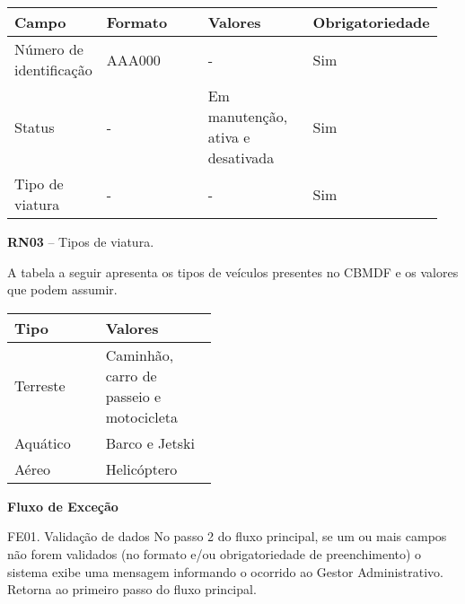    \begin{table*}[!h]
    \centering
      \begin{tabular}{|p{0.20\linewidth}|p{0.25\linewidth}|p{0.25\linewidth}|p{0.25\linewidth}|}
      \hline
      Campo & Formato & Valores & Obrigatoriedade\\
    
  \hline                               
  Número de identificação & AAA000 & - & Sim\\

  \hline                               
  Status & - & Em manutenção, ativa e desativada & Sim\\
  
  \hline                               
  Tipo de viatura & - & - & Sim\\
  
  \hline     
        
      \end{tabular}
    \end{table*}
    
  \textbf{RN03} – Tipos de viatura.
   
 A tabela a seguir apresenta os tipos de veículos presentes no CBMDF e os valores que podem assumir.
 
   \begin{table*}[!h]
    \centering
      \begin{tabular}{|p{0.20\linewidth}|p{0.25\linewidth}|}
      \hline
      Tipo & Valores\\
    
  \hline                               
  Terreste & Caminhão, carro de passeio e motocicleta\\

  \hline                               
  Aquático & Barco e Jetski\\

  \hline                               
  Aéreo & Helicóptero\\
  
  \hline     
        
      \end{tabular}
    \end{table*}

    
    
   {\raggedright
      \textbf{Fluxo de Exceção}
   }
   
   FE01. Validação de dados
	 No passo 2 do fluxo principal, se um ou mais campos não forem validados (no formato e/ou obrigatoriedade de 
 preenchimento) o sistema exibe uma mensagem informando o ocorrido ao Gestor Administrativo. Retorna ao 
 primeiro passo do fluxo principal.


